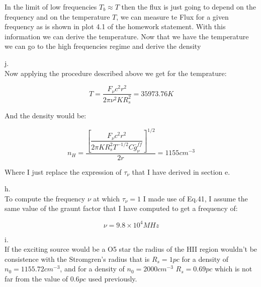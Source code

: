 \documentclass[12pt]{article}
\begin{document}
In the limit of low frequencies $T_b \approx T$ then the flux is just 
going to depend on the frequency and on the temperature $T$, we can measure
te Flux for a given frequency as is shown in plot 4.1 of the homework statement.
With this information we can derive the temperature. Now that we have the 
temperature we can go to the high frequencies regime and derive the density

j.\\

Now applying the procedure described above we get for the temprature:

\begin{equation}
T = \dfrac{F_{\nu} c^2 r^2 }{2 \pi \nu^2 K R_s^2 } = 35973.76 K
\end{equation} 

And the density would be:

\begin{equation}
n_H = \dfrac{\left[\dfrac{F_{\nu} c^2 r^2}{2 \pi K R_s^2 T^{-1/2} C \bar{g}_{\nu}^{ff}} \right]^{1/2}}{2r} = 1155 cm^{-3}
\end{equation}

Where I just replace the expression of $\tau_{\nu}$ that I have derived 
in section e.

h.\\

To compute the frequency $\nu$ at which $\tau_{\nu}=1$ I made use of Eq.41, 
I assume the same value of the graunt factor that I have computed to get a 
frequency of:

\begin{equation}
\nu = 9.8\times 10^{4} MHz 
\end{equation}

i.\\

If the exciting source would be a O5 star the radius of the HII region
wouldn't be consistence with the Stromgren's radius that is $R_s = 1 pc$
for a density of $n_0 = 1155.72 cm^{-3}$, and for a density of $n_0 = 2000 cm^{-3}$ $R_s = 0.69 pc$ which is not far from the value of $0.6pc$ used previously.
 
\end{document}
